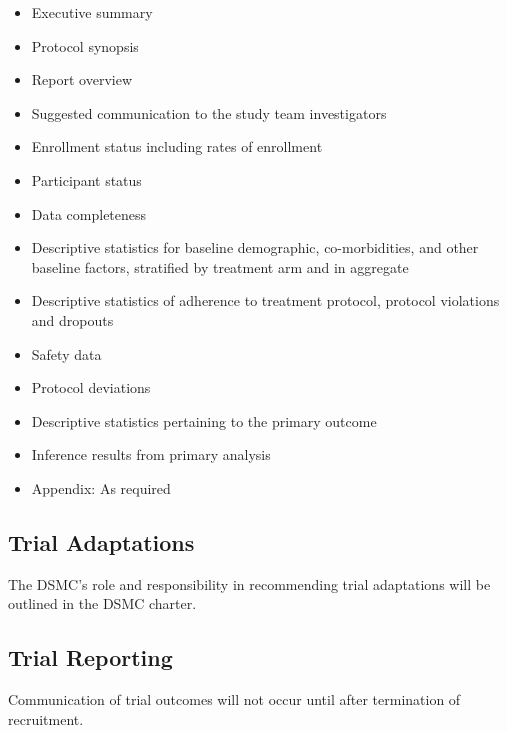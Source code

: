 \documentclass[11pt,parskip=half-]{scrartcl}
\providecommand{\tightlist}{%
  \setlength{\itemsep}{0pt}\setlength{\parskip}{0pt}}
\begin{document}
\begin{itemize}\tightlist
  \item
        Executive summary
  \item
        Protocol synopsis
  \item
        Report overview
  \item
        Suggested communication to the study team investigators
  \item
        Enrollment status including rates of enrollment
  \item
        Participant status
  \item
        Data completeness
  \item
        Descriptive statistics for baseline demographic, co-morbidities, and other baseline factors, stratified by treatment arm and in aggregate
  \item
        Descriptive statistics of adherence to treatment protocol, protocol violations and dropouts
  \item
        Safety data
  \item
        Protocol deviations
  \item
        Descriptive statistics pertaining to the primary outcome
  \item
        Inference results from primary analysis
  \item
        Appendix: As required
\end{itemize}


\subsection{Trial Adaptations}\label{trial-adaptations}

The DSMC's role and responsibility in recommending trial adaptations will be outlined in the DSMC charter.

\subsection{Trial Reporting}\label{trial-reporting}

Communication of trial outcomes will not occur until after termination of recruitment.

\clearpage

\printbibliography[heading=bibintoc]

\clearpage

\label{study-database}
\end{document}
